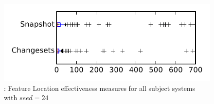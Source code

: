 
\begin{figure}
\centering
\includegraphics[height=0.4\textheight]{figures/flt_seed/rq1_tiny_24}
\caption{\rone: Feature Location effectiveness measures for all subject systems with $seed=24$}
\label{fig:flt_seed:rq1:tiny}
\end{figure}
